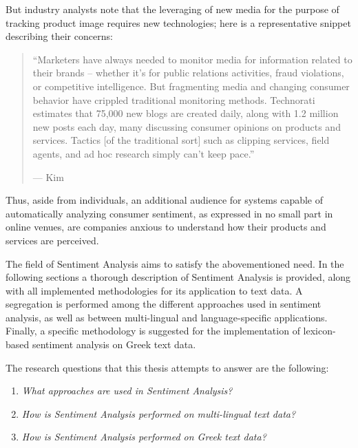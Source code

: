 But industry analysts note that the leveraging of new media for the
purpose of tracking product image requires new technologies; here is a
representative snippet describing their concerns:

\begin{quote}
``Marketers have always needed to monitor media
for information related to their brands --
whether it's for public relations activities,
fraud violations, or competitive intelligence.
But fragmenting media and changing consumer behavior
have crippled traditional monitoring methods.
Technorati estimates that 75,000 new blogs are created daily,
along with 1.2 million new posts each day,
many discussing consumer opinions on products and services.
Tactics [of the traditional sort]
such as clipping services, field agents,
and ad hoc research simply can't keep pace.''

\hfill --- Kim~\cite{Kim06}
\end{quote}

Thus, aside from individuals, an additional audience for systems capable
of automatically analyzing consumer sentiment, as expressed in no
small part in online venues, are companies anxious to understand how
their products and services are perceived.

The field of Sentiment Analysis aims to satisfy the abovementioned need.
In the following sections a thorough description of Sentiment Analysis is provided,
along with all implemented methodologies for its application to text data.
A segregation is performed
among the different approaches used in sentiment analysis,
as well as between multi-lingual and language-specific applications.
Finally, a specific methodology is suggested for the implementation
of lexicon-based sentiment analysis on Greek text data.

The research questions that this thesis attempts to answer are the following:

\begin{enumerate}
 \item \emph{What approaches are used in Sentiment Analysis?}
 \item \emph{How is Sentiment Analysis performed on multi-lingual text data?}
 \item \emph{How is Sentiment Analysis performed on Greek text data?}
\end{enumerate}

